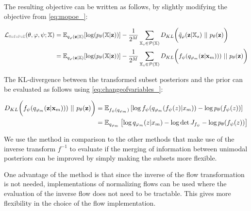 The resulting objective can be written as follows, by slightly modifying the  objective from \cref{eq:mopoe_}:

\begin{equation}
    \begin{split}
        \mathcal{L}_{\mg{MofoPoE}}(\theta, \phi, \psi; \xset) &=  \mathbb{E}_{q_{\phi}(\textbf{z}|\mathbb{X})}[\log (p_{\theta}(\mathbb{X}|\textbf{z}))] - \frac{1}{2^M} \sum _{\mathbb{X}_s \in \mathcal{P}(\mathbb{X})} D_{KL}\biggl( \tilde{q}_{\phi}(\textbf{z}|\mathbb{X}_s)\ ||\ p_{\theta}(\textbf{z})\biggr)\\
        &= \mathbb{E}_{q_{\phi}(\textbf{z}|\mathbb{X})}[\log (p_{\theta}(\mathbb{X}|\textbf{z}))] - \frac{1}{2^M} \sum _{\mathbb{X}_s \in \mathcal{P}(\mathbb{X})} D_{KL}\biggl( f_{\psi} (\unimodalpost))\ ||\ p_{\theta}(\textbf{z})\biggr)
    \end{split}
\end{equation}

The KL-divergence between the transformed subset posteriors and the prior can be evaluated as follows using \cref{eq:changeofvariables_}:

\begin{equation}
    \begin{split}
        D_{KL}\biggl( f_{\psi} (\unimodalpost))\ ||\ p_{\theta}(\textbf{z})\biggr) &= \mathbb{E}_{f_{\psi}(q_{\phi_m})} \left[ \log  f_{\psi} (q_{\phi_m}(f_{\psi}(z)|x_m)) - \log p_{\theta}(f_{\psi}(z))   \right]\\
        &= \mathbb{E}_{q_{\phi_m}} \left[ \log  q_{\phi_m}(z|x_m) - \log \det J_{f_{\psi}} - \log p_{\theta}(f_{\psi}(z))   \right]\\
    \end{split}
\end{equation}

We use the  method in comparison to the other methods that make use of the inverse transform $f^{-1}$ to evaluate if the merging of information between unimodal posteriors can be improved by simply making the subsets more flexible. %

One advantage of the  method is that since the inverse of the flow transformation is not needed, implementations of normalizing flows can be used where the evaluation of the inverse flow does not need to be tractable.
This gives more flexibility in the choice of the flow implementation.

